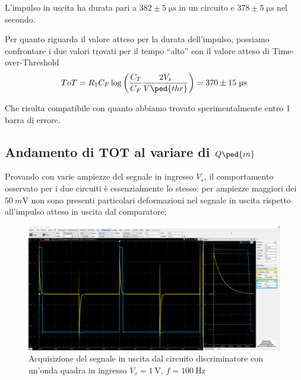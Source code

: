 \documentclass[10pt, a4paper, italian]{article}
\begin{document}
L'impulso in uscita ha durata pari a $382 \pm 5 \; \si{\micro\s}$ in un
circuito e $378 \pm 5 \; \si{\micro\s}$ nel secondo.

Per quanto riguarda il valore atteso per la durata dell'impulso, possiamo
confrontare i due valori trovati per il tempo ``alto'' con il valore atteso
di Time-over-Threshold
\[
ToT = R_1 C_F \log\left(\frac{C_T}{C_F} \frac{2 V_s}{V\ped{thr}}\right) =
370 \pm 15 \; \si{\micro\s}
\]

Che risulta compatibile con quanto abbiamo trovato sperimentalmente entro 1 barra di errore.

\subsection{Andamento di TOT al variare di $Q\ped{in}$}
Provando con varie ampiezze del segnale in ingresso $V_s$, il comportamento
osservato per i due circuiti è essenzialmente lo stesso: per ampiezze maggiori
dei $\SI{50}{m\V}$ non sono presenti particolari deformazioni nel segnale
in uscita rispetto all'impulso atteso in uscita dal comparatore;
\begin{figure}[htbp]
\centering
\includegraphics[scale=0.335]{shaper_discrzoom}
\caption{Acquisizione del segnale in uscita dal circuito discriminatore con
un'onda quadra in ingresso $V_s = \SI{1}{\V}$, $f = \SI{100}{\Hz}$
\label{fig: shaperdiscr}}
\end{figure}
\end{document}
